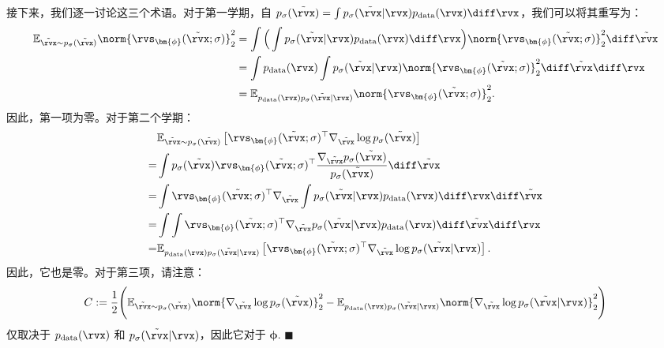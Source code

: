 接下来，我们逐一讨论这三个术语。对于第一学期，自 $p_\sigma(\tilde{\rvx}) = \int p_{\sigma}(\tilde{\rvx} | \rvx) p_{\text{data}}(\rvx) \diff\rvx$，我们可以将其重写为：
\begin{align*}
    \mathbb{E}_{\tilde{\rvx} \sim p_\sigma(\tilde{\rvx})} \norm{\rvs_{\bm{\phi}}(\tilde{\rvx}; \sigma)}_2^2
    &= \int \Big( \int p_{\sigma}(\tilde{\rvx} | \rvx) p_{\text{data}}(\rvx)  \diff\rvx \Big) \norm{\rvs_{\bm{\phi}}(\tilde{\rvx}; \sigma)}_2^2 \diff \tilde{\rvx}
    \\ &= \int p_{\text{data}}(\rvx) \int p_{\sigma}(\tilde{\rvx} | \rvx) \norm{\rvs_{\bm{\phi}}(\tilde{\rvx}; \sigma)}_2^2 \diff \tilde{\rvx} \diff\rvx
    \\ &= \mathbb{E}_{ p_{\text{data}}(\rvx)p_{\sigma}(\tilde{\rvx} | \rvx)} \norm{\rvs_{\bm{\phi}}(\tilde{\rvx}; \sigma)}_2^2.
\end{align*}
因此，第一项为零。对于第二个学期：
\begin{align}\label{eq:dsm-sec-term}
\begin{aligned}
          &\mathbb{E}_{\tilde{\rvx} \sim p_\sigma(\tilde{\rvx})}\left[ \rvs_{\bm{\phi}}(\tilde{\rvx}; \sigma)^\top  \nabla_{\tilde{\rvx}} \log p_\sigma(\tilde{\rvx}) \right]
      \\=&\int  p_\sigma(\tilde{\rvx}) \rvs_{\bm{\phi}}(\tilde{\rvx}; \sigma)^\top  \frac{\nabla_{\tilde{\rvx}} p_\sigma(\tilde{\rvx})}{p_\sigma(\tilde{\rvx})}  \diff\tilde\rvx
        \\=&\int   \rvs_{\bm{\phi}}(\tilde{\rvx}; \sigma)^\top  \nabla_{\tilde{\rvx}} \int p_{\sigma}(\tilde{\rvx} | \rvx) p_{\text{data}}(\rvx) \diff\rvx \diff\tilde\rvx
    \\=&\int \int  \rvs_{\bm{\phi}}(\tilde{\rvx}; \sigma)^\top    \nabla_{\tilde{\rvx}}p_{\sigma}(\tilde{\rvx} | \rvx) p_{\text{data}}(\rvx) \diff\tilde\rvx \diff\rvx
      \\=  &\mathbb{E}_{ p_{\text{data}}(\rvx)p_{\sigma}(\tilde{\rvx} | \rvx)}\left[ \rvs_{\bm{\phi}}(\tilde{\rvx}; \sigma)^\top  \nabla_{\tilde{\rvx}} \log p_\sigma(\tilde{\rvx}| \rvx)\right].
\end{aligned}
\end{align}
因此，它也是零。对于第三项，请注意：
\[
C:=\frac{1}{2}\Bigg(\mathbb{E}_{\tilde{\rvx} \sim p_\sigma(\tilde{\rvx})}  \norm{\nabla_{\tilde{\rvx}} \log p_\sigma(\tilde{\rvx})}_2^2  -  \mathbb{E}_{ p_{\text{data}}(\rvx)p_{\sigma}(\tilde{\rvx} | \rvx)} \norm{\nabla_{\tilde{\rvx}} \log p_{\sigma}(\tilde{\rvx} | \rvx)}_2^2   \Bigg)
\]
仅取决于 $p_{\text{data}}(\rvx)$ 和 $p_{\sigma}(\tilde{\rvx}|\rvx)$，因此它对于 $\bm{\phi}$.
\hfill$\blacksquare$

